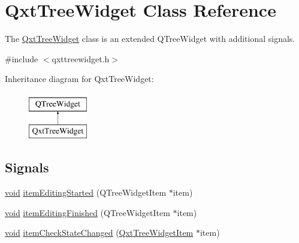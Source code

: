 \hypertarget{class_qxt_tree_widget}{\section{Qxt\-Tree\-Widget Class Reference}
\label{class_qxt_tree_widget}
}


The \hyperlink{class_qxt_tree_widget}{Qxt\-Tree\-Widget} class is an extended Q\-Tree\-Widget with additional signals.  




{\ttfamily \#include $<$qxttreewidget.\-h$>$}

Inheritance diagram for Qxt\-Tree\-Widget\-:\begin{figure}[H]
\begin{center}
\leavevmode
\includegraphics[height=2.000000cm]{class_qxt_tree_widget}
\end{center}
\end{figure}
\subsection*{Signals}
\begin{DoxyCompactItemize}
\item 
\hyperlink{group___u_a_v_objects_plugin_ga444cf2ff3f0ecbe028adce838d373f5c}{void} \hyperlink{class_qxt_tree_widget_a2f80d0770ff2ad1904e26ed236d8e4ee}{item\-Editing\-Started} (Q\-Tree\-Widget\-Item $\ast$item)
\item 
\hyperlink{group___u_a_v_objects_plugin_ga444cf2ff3f0ecbe028adce838d373f5c}{void} \hyperlink{class_qxt_tree_widget_a614beb6b5c7a272c30823eb4b3b408ca}{item\-Editing\-Finished} (Q\-Tree\-Widget\-Item $\ast$item)
\item 
\hyperlink{group___u_a_v_objects_plugin_ga444cf2ff3f0ecbe028adce838d373f5c}{void} \hyperlink{class_qxt_tree_widget_a19b8f33f02812013b0362caca1a2be68}{item\-Check\-State\-Changed} (\hyperlink{class_qxt_tree_widget_item}{Qxt\-Tree\-Widget\-Item} $\ast$item)
\end{DoxyCompactItemize}

